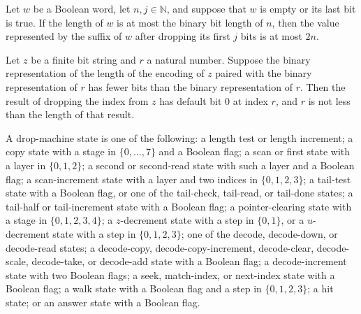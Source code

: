 \begin{lemma}
\label{Complexity.query_accumulator_bound}
\leanok
{}
Let $w$ be a Boolean word, let $n,j\in\mathbb{N}$, and suppose that $w$ is empty or its
last bit is true. If the length of $w$ is at most the binary bit length of $n$, then the
value represented by the suffix of $w$ after dropping its first $j$ bits is at most
$2n$.
\end{lemma}

\begin{lemma}
\label{Complexity.dropIdx_query_overflow}
\leanok
{}
Let $z$ be a finite bit string and $r$ a natural number. Suppose the binary
representation of the length of the encoding of $z$ paired with the binary
representation of $r$ has fewer bits than the binary representation of $r$. Then the
result of dropping the index from $z$ has default bit $0$ at index $r$, and $r$ is not
less than the length of that result.
\end{lemma}

\begin{definition}
\label{Complexity.DropState}
\leanok
A drop-machine state is one of the following: a length test or length increment; a copy
state with a stage in $\{0,\ldots,7\}$ and a Boolean flag; a scan or first state with a
layer in $\{0,1,2\}$; a second or second-read state with such a layer and a Boolean
flag; a scan-increment state with a layer and two indices in $\{0,1,2,3\}$; a tail-test
state with a Boolean flag, or one of the tail-check, tail-read, or tail-done states; a
tail-half or tail-increment state with a Boolean flag; a pointer-clearing state with a
stage in $\{0,1,2,3,4\}$; a $z$-decrement state with a step in $\{0,1\}$, or a
$u$-decrement state with a step in $\{0,1,2,3\}$; one of the decode, decode-down, or
decode-read states; a decode-copy, decode-copy-increment, decode-clear, decode-scale,
decode-take, or decode-add state with a Boolean flag; a decode-increment state with two
Boolean flags; a seek, match-index, or next-index state with a Boolean flag; a walk
state with a Boolean flag and a step in $\{0,1,2,3\}$; a hit state; or an answer state
with a Boolean flag.
\end{definition}

